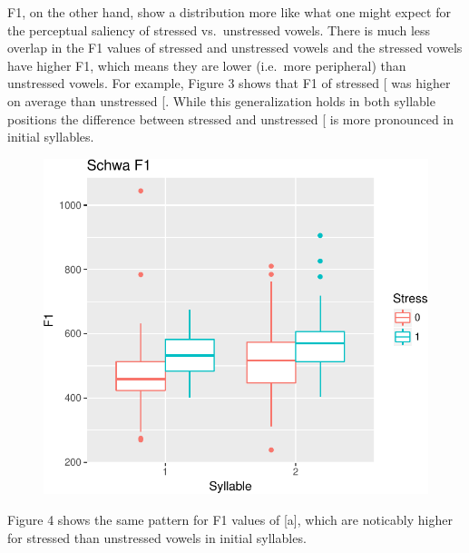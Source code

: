 \documentclass[floatsintext,man]{apa6}
\theoremstyle{definition}
\theoremstyle{definition}
\theoremstyle{definition}
\theoremstyle{remark}
\begin{document}
F1, on the other hand, show a distribution more like what one might
expect for the perceptual saliency of stressed vs.~unstressed vowels.
There is much less overlap in the F1 values of stressed and unstressed
vowels and the stressed vowels have higher F1, which means they are
lower (i.e.~more peripheral) than unstressed vowels. For example, Figure
3 shows that F1 of stressed {[}\textipa{@}{]} was higher on average than
unstressed {[}\textipa{@}{]}. While this generalization holds in both
syllable positions the difference between stressed and unstressed
{[}\textipa{@}{]} is more pronounced in initial syllables.

\begin{figure}
\centering
\includegraphics{mistress_restat_files/figure-latex/f1plot-1.pdf}
\caption{}
\end{figure}

Figure 4 shows the same pattern for F1 values of {[}a{]}, which are
noticably higher for stressed than unstressed vowels in initial
syllables.
\end{document}
